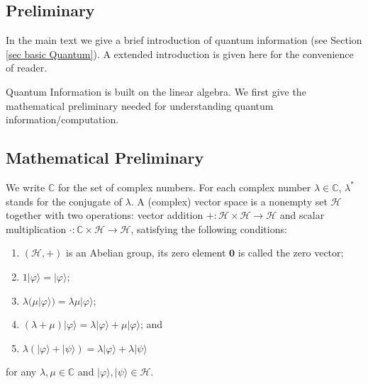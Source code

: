 \documentclass[conference,compsoc, 10pt]{IEEEtran}
\begin{document}
	
	\setcounter{section}{0}
	
	\begin{appendices}
		
		\section{Preliminary}
		\label{sec basic Quantum app}
		
		In the main text we give a brief introduction of quantum information (see Section \ref{sec basic Quantum}). A extended introduction is given here for the convenience of reader.
		
		Quantum Information is built on the linear algebra. We first give the mathematical preliminary needed for understanding quantum information/computation.
		
		\subsection{Mathematical Preliminary}
		
		We write $\mathbb{C}$ for the set of complex numbers. For each
		complex number $\lambda\in \mathbb{C}$, $\lambda^{\ast}$ stands for
		the conjugate of $\lambda$. A (complex) vector space is a nonempty
		set $\mathcal{H}$ together with two operations: vector addition $+:
		\mathcal{H}\times \mathcal{H}\rightarrow \mathcal{H}$ and scalar
		multiplication $\cdot : \mathbb{C}\times \mathcal{H}\rightarrow
		\mathcal{H}$, satisfying the following conditions:
		\begin{enumerate}\item $(\mathcal{H},+)$ is an Abelian group, its zero element $\mathbf{0}$ is called the zero vector; \item
			$1|\varphi\rangle=|\varphi\rangle$; \item $\lambda (\mu
			|\varphi\rangle)=\lambda\mu |\varphi\rangle$; \item $(\lambda
			+\mu)|\varphi\rangle =\lambda |\varphi\rangle +\mu |\varphi\rangle$;
			and \item $\lambda (|\varphi\rangle +|\psi\rangle)=\lambda
			|\varphi\rangle + \lambda |\psi\rangle$ \end{enumerate} for any
		$\lambda,\mu\in\mathbb{C}$ and $|\varphi\rangle,
		|\psi\rangle\in\mathcal{H}$.
		

\end{appendices}
\end{document}
